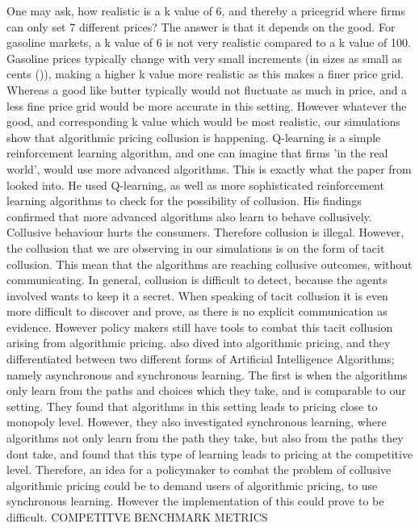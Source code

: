 \documentclass{article}
\begin{document}
\newline 
One may ask, how realistic is a k value of 6, and thereby a pricegrid where firms can only set 7 different prices? The answer is that it depends on the good. For gasoline markets, a k value of 6 is not very realistic compared to a k value of 100. Gasoline prices typically change with very small increments (in sizes as small as cents (\cite{eia_gasoline_fluctuations})), making a higher k value more realistic as this makes a finer price grid. Whereas a good like butter typically would not fluctuate as much in price, and a less fine price grid would be more accurate in this setting. However whatever the good, and corresponding k value which would be most realistic, our simulations show that algorithmic pricing collusion is happening.
\newline
Q-learning is a simple reinforcement learning algorithm, and one can imagine that firms 'in the real world', would use more advanced algorithms. This is exactly what the paper from \cite{Julius2023} looked into. He used Q-learning, as well as more sophisticated reinforcement learning algorithms to check for the possibility of collusion. His findings confirmed that more advanced algorithms also learn to behave collusively. 
\newline
Collusive behaviour hurts the consumers. Therefore collusion is illegal. However, the collusion that we are observing in our simulations is on the form of tacit collusion. This mean that the algorithms are reaching collusive outcomes, without communicating. In general, collusion is difficult to detect, because the agents involved wants to keep it a secret. When speaking of tacit collusion it is even more difficult to discover and prove, as there is no explicit communication as evidence. 
However policy makers still have tools to combat this tacit collusion arising from algorithmic pricing. \cite{Asker} also dived into algorithmic pricing, and they differentiated between two different forms of Artificial Intelligence Algorithms; namely asynchronous and synchronous learning. The first is when the algorithms only learn from the paths and choices which they take, and is comparable to our setting. They found that algorithms in this setting leads to pricing close to monopoly level. However, they also investigated synchronous learning, where algorithms not only learn from the path they take, but also from the paths they dont take, and found that this type of learning leads to pricing at the competitive level.
Therefore, an idea for a policymaker to combat the problem of collusive algorithmic pricing could be to demand users of algorithmic pricing, to use synchronous learning. However the implementation of this could prove to be difficult.
\newline
COMPETITVE BENCHMARK METRICS
\end{document}
